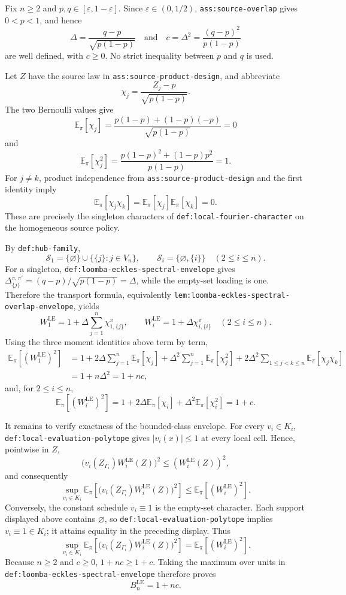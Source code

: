 Fix \(n\ge 2\) and \(p,q\in[\varepsilon,1-\varepsilon]\).  Since \(\varepsilon\in(0,1/2)\), \texttt{ass:source-overlap} gives \(0<p<1\), and hence
\[
 \Delta=\frac{q-p}{\sqrt{p(1-p)}}
 \quad\text{and}\quad
 c=\Delta^2=\frac{(q-p)^2}{p(1-p)}
\]
are well defined, with \(c\ge0\).  No strict inequality between \(p\) and \(q\) is used.

Let \(Z\) have the source law in \texttt{ass:source-product-design}, and abbreviate
\[
 \chi_j=\frac{Z_j-p}{\sqrt{p(1-p)}}.
\]
The two Bernoulli values give
\[
 \mathbb E_{\pi}[\chi_j]
 =\frac{p(1-p)+(1-p)(-p)}{\sqrt{p(1-p)}}=0
\]
and
\[
 \mathbb E_{\pi}[\chi_j^2]
 =\frac{p(1-p)^2+(1-p)p^2}{p(1-p)}=1.
\]
For \(j\ne k\), product independence from \texttt{ass:source-product-design} and the first identity imply
\[
 \mathbb E_{\pi}[\chi_j\chi_k]
 =\mathbb E_{\pi}[\chi_j]\mathbb E_{\pi}[\chi_k]=0.
\]
These are precisely the singleton characters of \texttt{def:local-fourier-character} on the homogeneous source policy.

By \texttt{def:hub-family},
\[
 \mathcal S_1=\{\varnothing\}\cup\{\{j\}:j\in V_n\},
 \qquad
 \mathcal S_i=\{\varnothing,\{i\}\}\quad(2\le i\le n).
\]
For a singleton, \texttt{def:loomba-eckles-spectral-envelope} gives
\(
 \Delta_{\{j\}}^{\pi,\pi'}=(q-p)/\sqrt{p(1-p)}=\Delta
\), while the empty-set loading is one.  Therefore the transport formula, equivalently \texttt{lem:loomba-eckles-spectral-overlap-envelope}, yields
\[
 W_1^{\mathrm{LE}}
 =1+\Delta\sum_{j=1}^n\chi_{1,\{j\}}^{\pi},
 \qquad
 W_i^{\mathrm{LE}}
 =1+\Delta\chi_{i,\{i\}}^{\pi}\quad(2\le i\le n).
\]
Using the three moment identities above term by term,
\[
\begin{aligned}
 \mathbb E_{\pi}\!\left[(W_1^{\mathrm{LE}})^2\right]
 &=1+2\Delta\sum_{j=1}^n\mathbb E_{\pi}[\chi_j]
   +\Delta^2\sum_{j=1}^n\mathbb E_{\pi}[\chi_j^2]
   +2\Delta^2\sum_{1\le j<k\le n}\mathbb E_{\pi}[\chi_j\chi_k]\\
 &=1+n\Delta^2=1+nc,
\end{aligned}
\]
and, for \(2\le i\le n\),
\[
 \mathbb E_{\pi}\!\left[(W_i^{\mathrm{LE}})^2\right]
 =1+2\Delta\mathbb E_{\pi}[\chi_i]
   +\Delta^2\mathbb E_{\pi}[\chi_i^2]
 =1+c.
\]

It remains to verify exactness of the bounded-class envelope.  For every \(v_i\in K_i\), \texttt{def:local-evaluation-polytope} gives \(|v_i(x)|\le1\) at every local cell.  Hence, pointwise in \(Z\),
\[
 \bigl(v_i(Z_{\Gamma_i})W_i^{\mathrm{LE}}(Z)\bigr)^2
 \le (W_i^{\mathrm{LE}}(Z))^2,
\]
and consequently
\[
 \sup_{v_i\in K_i}\mathbb E_{\pi}\!\left[
   \bigl(v_i(Z_{\Gamma_i})W_i^{\mathrm{LE}}(Z)\bigr)^2
 \right]
 \le \mathbb E_{\pi}\!\left[(W_i^{\mathrm{LE}})^2\right].
\]
Conversely, the constant schedule \(v_i\equiv1\) is the empty-set character.  Each support displayed above contains \(\varnothing\), so \texttt{def:local-evaluation-polytope} implies \(v_i\equiv1\in K_i\); it attains equality in the preceding display.  Thus
\[
 \sup_{v_i\in K_i}\mathbb E_{\pi}\!\left[
   \bigl(v_i(Z_{\Gamma_i})W_i^{\mathrm{LE}}(Z)\bigr)^2
 \right]
 =\mathbb E_{\pi}\!\left[(W_i^{\mathrm{LE}})^2\right].
\]
Because \(n\ge2\) and \(c\ge0\), \(1+nc\ge1+c\).  Taking the maximum over units in \texttt{def:loomba-eckles-spectral-envelope} therefore proves
\[
 B_n^{\mathrm{LE}}=1+nc.
\]


